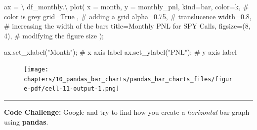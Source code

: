 \documentclass[
  letterpaper,
  DIV=11,
  numbers=noendperiod]{scrreprt}
\newenvironment{Shaded}{\begin{snugshade}}{\end{snugshade}}
\newcommand{\CommentTok}[1]{\textcolor[rgb]{0.37,0.37,0.37}{#1}}
\newcommand{\DecValTok}[1]{\textcolor[rgb]{0.68,0.00,0.00}{#1}}
\newcommand{\FloatTok}[1]{\textcolor[rgb]{0.68,0.00,0.00}{#1}}
\newcommand{\NormalTok}[1]{\textcolor[rgb]{0.00,0.23,0.31}{#1}}
\newcommand{\OperatorTok}[1]{\textcolor[rgb]{0.37,0.37,0.37}{#1}}
\newcommand{\StringTok}[1]{\textcolor[rgb]{0.13,0.47,0.30}{#1}}
\newcommand{\VariableTok}[1]{\textcolor[rgb]{0.07,0.07,0.07}{#1}}
\begin{document}
\begin{Shaded}
\begin{Highlighting}[]
\NormalTok{ax }\OperatorTok{=} \OperatorTok{\textbackslash{}}
\NormalTok{    df\_monthly.}\OperatorTok{\textbackslash{}}
\NormalTok{        plot(}
\NormalTok{            x }\OperatorTok{=} \StringTok{\textquotesingle{}month\textquotesingle{}}\NormalTok{,}
\NormalTok{            y }\OperatorTok{=} \StringTok{\textquotesingle{}monthly\_pnl\textquotesingle{}}\NormalTok{,}
\NormalTok{            kind}\OperatorTok{=}\StringTok{\textquotesingle{}bar\textquotesingle{}}\NormalTok{,}
\NormalTok{            color}\OperatorTok{=}\StringTok{\textquotesingle{}k\textquotesingle{}}\NormalTok{, }\CommentTok{\# color is grey}
\NormalTok{            grid}\OperatorTok{=}\VariableTok{True}\NormalTok{ , }\CommentTok{\# adding a grid}
\NormalTok{            alpha}\OperatorTok{=}\FloatTok{0.75}\NormalTok{, }\CommentTok{\# translucence}
\NormalTok{            width}\OperatorTok{=}\FloatTok{0.8}\NormalTok{, }\CommentTok{\# increasing the width of the bars}
\NormalTok{            title}\OperatorTok{=}\StringTok{\textquotesingle{}Monthly PNL for SPY Calls\textquotesingle{}}\NormalTok{,}
\NormalTok{            figsize}\OperatorTok{=}\NormalTok{(}\DecValTok{8}\NormalTok{, }\DecValTok{4}\NormalTok{), }\CommentTok{\# modifying the figure size}
\NormalTok{        )}\OperatorTok{;}

\NormalTok{ax.set\_xlabel(}\StringTok{"Month"}\NormalTok{)}\OperatorTok{;} \CommentTok{\# x axis label}
\NormalTok{ax.set\_ylabel(}\StringTok{"PNL"}\NormalTok{)}\OperatorTok{;}   \CommentTok{\# y axis label}
\end{Highlighting}
\end{Shaded}

\begin{figure}[H]

{\centering \texttt{[image: chapters/10\_pandas\_bar\_charts/pandas\_bar\_charts\_files/figure-pdf/cell-11-output-1.png]}

}

\end{figure}

\begin{center}\rule{0.5\linewidth}{0.5pt}\end{center}

\textbf{Code Challenge:} Google and try to find how you create a
\emph{horizontal} bar graph using \textbf{pandas}.
\end{document}

